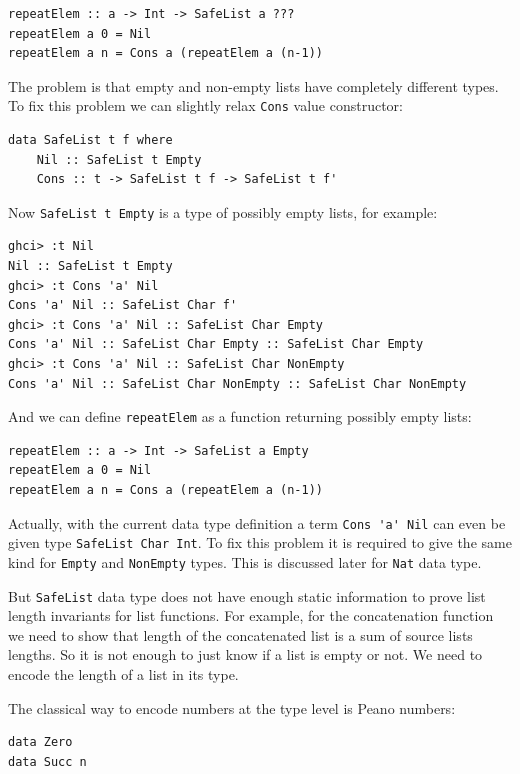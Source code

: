 \documentclass{tmr}
\begin{document}
\begin{Verbatim}
repeatElem :: a -> Int -> SafeList a ???
repeatElem a 0 = Nil
repeatElem a n = Cons a (repeatElem a (n-1))
\end{Verbatim}

The problem is that empty and non-empty lists have completely different types. To fix this problem we can slightly relax \verb|Cons| value constructor:

\begin{Verbatim}
data SafeList t f where
    Nil :: SafeList t Empty
    Cons :: t -> SafeList t f -> SafeList t f'
\end{Verbatim}

Now \verb|SafeList t Empty| is a type of possibly empty lists, for example:

\begin{Verbatim}
ghci> :t Nil
Nil :: SafeList t Empty
ghci> :t Cons 'a' Nil
Cons 'a' Nil :: SafeList Char f'
ghci> :t Cons 'a' Nil :: SafeList Char Empty
Cons 'a' Nil :: SafeList Char Empty :: SafeList Char Empty
ghci> :t Cons 'a' Nil :: SafeList Char NonEmpty
Cons 'a' Nil :: SafeList Char NonEmpty :: SafeList Char NonEmpty
\end{Verbatim}

And we can define \verb|repeatElem| as a function returning possibly empty lists:

\begin{Verbatim}
repeatElem :: a -> Int -> SafeList a Empty
repeatElem a 0 = Nil
repeatElem a n = Cons a (repeatElem a (n-1))
\end{Verbatim}

Actually, with the current data type definition a term \verb|Cons 'a' Nil| can even be given type \verb|SafeList Char Int|. To fix this problem it is required to give the same kind for \verb|Empty| and \verb|NonEmpty| types. This is discussed later for \verb|Nat| data type.

But \verb|SafeList| data type does not have enough static information to prove list length invariants for list functions. For example, for the concatenation function we need to show that length of the concatenated list is a sum of source lists lengths. So it is not enough to just know if a list is empty or not. We need to encode the length of a list in its type.

The classical way to encode numbers at the type level is Peano numbers:

\begin{Verbatim}
data Zero
data Succ n
\end{Verbatim}
\end{document}
